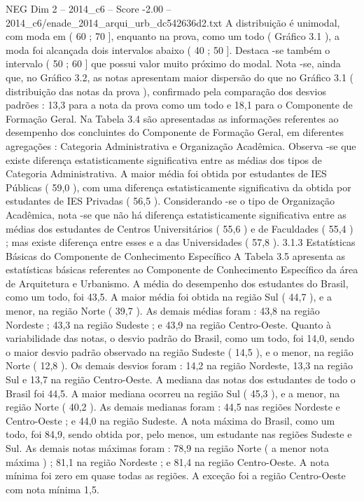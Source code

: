 \begin{textsample}{NEG Dim 2 – 2014\_c6 – Score -2.00 – 2014\_c6/enade\_2014\_arqui\_urb\_dc542636d2.txt}
A distribuição é unimodal, com moda em ( 60 ; 70 ], enquanto na prova, como um todo ( Gráfico 3.1 ), a moda foi alcançada dois intervalos abaixo ( 40 ; 50 ].
Destaca -se também o intervalo ( 50 ; 60 ] que possui valor muito próximo do modal.
Nota -se, ainda que, no Gráfico 3.2, as notas apresentam maior dispersão do que no Gráfico 3.1 ( distribuição das notas da prova ), confirmado pela comparação dos desvios padrões : 13,3 para a nota da prova como um todo e 18,1 para o Componente de Formação Geral.
Na Tabela 3.4 são apresentadas as informações referentes ao desempenho dos concluintes do Componente de Formação Geral, em diferentes agregações : Categoria Administrativa e Organização Acadêmica.
Observa -se que existe diferença estatisticamente significativa entre as médias dos tipos de Categoria Administrativa.
A maior média foi obtida por estudantes de IES Públicas ( 59,0 ), com uma diferença estatisticamente significativa da obtida por estudantes de IES Privadas ( 56,5 ).
Considerando -se o tipo de Organização Acadêmica, nota -se que não há diferença estatisticamente significativa entre as médias dos estudantes de Centros Universitários ( 55,6 ) e de Faculdades ( 55,4 ) ; mas existe diferença entre esses e a das Universidades ( 57,8 ). 3.1.3 Estatísticas Básicas do Componente de Conhecimento Específico A Tabela 3.5 apresenta as estatísticas básicas referentes ao Componente de Conhecimento Específico da área de Arquitetura e Urbanismo.
A média do desempenho dos estudantes do Brasil, como um todo, foi 43,5.
A maior média foi obtida na região Sul ( 44,7 ), e a menor, na região Norte ( 39,7 ).
As demais médias foram : 43,8 na região Nordeste ; 43,3 na região Sudeste ; e 43,9 na região Centro-Oeste.
Quanto à variabilidade das notas, o desvio padrão do Brasil, como um todo, foi 14,0, sendo o maior desvio padrão observado na região Sudeste ( 14,5 ), e o menor, na região Norte ( 12,8 ).
Os demais desvios foram : 14,2 na região Nordeste, 13,3 na região Sul e 13,7 na região Centro-Oeste.
A mediana das notas dos estudantes de todo o Brasil foi 44,5.
A maior mediana ocorreu na região Sul ( 45,3 ), e a menor, na região Norte ( 40,2 ).
As demais medianas foram : 44,5 nas regiões Nordeste e Centro-Oeste ; e 44,0 na região Sudeste.
A nota máxima do Brasil, como um todo, foi 84,9, sendo obtida por, pelo menos, um estudante nas regiões Sudeste e Sul.
As demais notas máximas foram : 78,9 na região Norte ( a menor nota máxima ) ; 81,1 na região Nordeste ; e 81,4 na região Centro-Oeste.
A nota mínima foi zero em quase todas as regiões.
A exceção foi a região Centro-Oeste com nota mínima 1,5.

\end{textsample}
